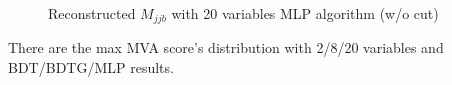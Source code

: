 			\begin{figure}[H]
			\centering
			    \\
			\caption{Reconstructed $M_{jjb}$ with 20 variables MLP algorithm (w/o cut)}
			\label{EventSelReco:fig:a05_MLP_SR_NC_Mjjb}
			\end{figure}
			\FloatBarrier

			There are the max MVA score's distribution with 2/8/20 variables and BDT/BDTG/MLP results.

